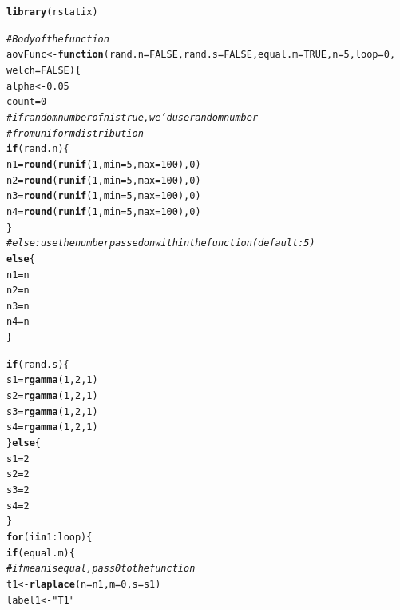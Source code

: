 \documentclass{article}\usepackage[]{graphicx}\usepackage[]{color}
\makeatletter
\newcommand{\hlnum}[1]{\textcolor[rgb]{0.686,0.059,0.569}{#1}}%
\newcommand{\hlstr}[1]{\textcolor[rgb]{0.192,0.494,0.8}{#1}}%
\newcommand{\hlcom}[1]{\textcolor[rgb]{0.678,0.584,0.686}{\textit{#1}}}%
\newcommand{\hlopt}[1]{\textcolor[rgb]{0,0,0}{#1}}%
\newcommand{\hlstd}[1]{\textcolor[rgb]{0.345,0.345,0.345}{#1}}%
\newcommand{\hlkwa}[1]{\textcolor[rgb]{0.161,0.373,0.58}{\textbf{#1}}}%
\newcommand{\hlkwb}[1]{\textcolor[rgb]{0.69,0.353,0.396}{#1}}%
\newcommand{\hlkwc}[1]{\textcolor[rgb]{0.333,0.667,0.333}{#1}}%
\newcommand{\hlkwd}[1]{\textcolor[rgb]{0.737,0.353,0.396}{\textbf{#1}}}%
\newenvironment{kframe}{%
 \def\at@end@of@kframe{}%
 \ifinner\ifhmode%
  \def\at@end@of@kframe{\end{minipage}}%
  \begin{minipage}{\columnwidth}%
 \fi\fi%
 \def\FrameCommand##1{\hskip\@totalleftmargin \hskip-\fboxsep
 \colorbox{shadecolor}{##1}\hskip-\fboxsep
     \hskip-\linewidth \hskip-\@totalleftmargin \hskip\columnwidth}%
 \MakeFramed {\advance\hsize-\width
   \@totalleftmargin\z@ \linewidth\hsize
   \@setminipage}}%
 {\par\unskip\endMakeFramed%
 \at@end@of@kframe}
\newenvironment{knitrout}{}{} %
\makeatother
\begin{document}
\begin{enumerate}
\begin{enumerate}
\begin{knitrout}
\color{fgcolor}\begin{kframe}
\begin{alltt}
\hlkwd{library}\hlstd{(rstatix)}

\hlcom{#Body of the function}
\hlstd{aovFunc} \hlkwb{<-} \hlkwa{function}\hlstd{(}\hlkwc{rand.n}\hlstd{=}\hlnum{FALSE}\hlstd{,} \hlkwc{rand.s}\hlstd{=}\hlnum{FALSE}\hlstd{,} \hlkwc{equal.m}\hlstd{=}\hlnum{TRUE}\hlstd{,} \hlkwc{n}\hlstd{=}\hlnum{5}\hlstd{,} \hlkwc{loop}\hlstd{=}\hlnum{0}\hlstd{,}
                    \hlkwc{welch}\hlstd{=}\hlnum{FALSE}\hlstd{)\{}
  \hlstd{alpha}\hlkwb{<-}\hlnum{0.05}
  \hlstd{count}\hlkwb{=}\hlnum{0}
  \hlcom{#if random number of n is true, we'd use random number }
  \hlcom{#from uniform distribution}
  \hlkwa{if}\hlstd{(rand.n)\{}
    \hlstd{n1}\hlkwb{=}\hlkwd{round}\hlstd{(}\hlkwd{runif}\hlstd{(}\hlnum{1}\hlstd{,} \hlkwc{min}\hlstd{=}\hlnum{5}\hlstd{,} \hlkwc{max}\hlstd{=}\hlnum{100}\hlstd{),}\hlnum{0}\hlstd{)}
    \hlstd{n2}\hlkwb{=}\hlkwd{round}\hlstd{(}\hlkwd{runif}\hlstd{(}\hlnum{1}\hlstd{,} \hlkwc{min}\hlstd{=}\hlnum{5}\hlstd{,} \hlkwc{max}\hlstd{=}\hlnum{100}\hlstd{),}\hlnum{0}\hlstd{)}
    \hlstd{n3}\hlkwb{=}\hlkwd{round}\hlstd{(}\hlkwd{runif}\hlstd{(}\hlnum{1}\hlstd{,} \hlkwc{min}\hlstd{=}\hlnum{5}\hlstd{,} \hlkwc{max}\hlstd{=}\hlnum{100}\hlstd{),}\hlnum{0}\hlstd{)}
    \hlstd{n4}\hlkwb{=}\hlkwd{round}\hlstd{(}\hlkwd{runif}\hlstd{(}\hlnum{1}\hlstd{,} \hlkwc{min}\hlstd{=}\hlnum{5}\hlstd{,} \hlkwc{max}\hlstd{=}\hlnum{100}\hlstd{),}\hlnum{0}\hlstd{)}
  \hlstd{\}}
  \hlcom{#else: use the number passed on within the function (default: 5)}
  \hlkwa{else}\hlstd{\{}
    \hlstd{n1}\hlkwb{=}\hlstd{n}
    \hlstd{n2}\hlkwb{=}\hlstd{n}
    \hlstd{n3}\hlkwb{=}\hlstd{n}
    \hlstd{n4}\hlkwb{=}\hlstd{n}
  \hlstd{\}}

  \hlkwa{if}\hlstd{(rand.s)\{}
    \hlstd{s1}\hlkwb{=}\hlkwd{rgamma}\hlstd{(}\hlnum{1}\hlstd{,} \hlnum{2}\hlstd{,} \hlnum{1}\hlstd{)}
    \hlstd{s2}\hlkwb{=}\hlkwd{rgamma}\hlstd{(}\hlnum{1}\hlstd{,} \hlnum{2}\hlstd{,} \hlnum{1}\hlstd{)}
    \hlstd{s3}\hlkwb{=}\hlkwd{rgamma}\hlstd{(}\hlnum{1}\hlstd{,} \hlnum{2}\hlstd{,} \hlnum{1}\hlstd{)}
    \hlstd{s4}\hlkwb{=}\hlkwd{rgamma}\hlstd{(}\hlnum{1}\hlstd{,} \hlnum{2}\hlstd{,} \hlnum{1}\hlstd{)}
  \hlstd{\}}\hlkwa{else}\hlstd{\{}
    \hlstd{s1}\hlkwb{=}\hlnum{2}
    \hlstd{s2}\hlkwb{=}\hlnum{2}
    \hlstd{s3}\hlkwb{=}\hlnum{2}
    \hlstd{s4}\hlkwb{=}\hlnum{2}
  \hlstd{\}}
  \hlkwa{for}\hlstd{(i} \hlkwa{in} \hlnum{1}\hlopt{:}\hlstd{loop)\{}
    \hlkwa{if}\hlstd{(equal.m)\{}
      \hlcom{#if mean is equal, pass 0 to the function}
      \hlstd{t1}\hlkwb{<-}\hlkwd{rlaplace}\hlstd{(}\hlkwc{n}\hlstd{=n1,} \hlkwc{m}\hlstd{=}\hlnum{0}\hlstd{,} \hlkwc{s}\hlstd{=s1)}
      \hlstd{label1}\hlkwb{<-}\hlstr{"T1"}


\end{alltt}
\end{kframe}
\end{knitrout}
\end{enumerate}
\end{enumerate}
\end{document}
